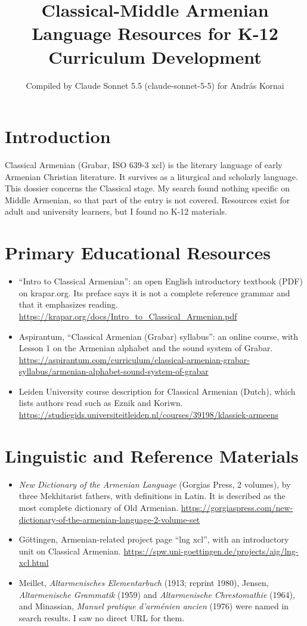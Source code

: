 \documentclass[12pt]{article}
\title{Classical-Middle Armenian Language Resources for K-12 Curriculum Development}
\author{Compiled by Claude Sonnet 5.5 (claude-sonnet-5-5) for Andr\'as Kornai}
\date{}
\begin{document}
\maketitle

\section{Introduction}
Classical Armenian (Grabar, ISO 639-3 xcl) is the literary language of early Armenian Christian literature. It survives as a liturgical and scholarly language. This dossier concerns the Classical stage. My search found nothing specific on Middle Armenian, so that part of the entry is not covered. Resources exist for adult and university learners, but I found no K-12 materials.

\section{Primary Educational Resources}
\begin{itemize}
\item ``Intro to Classical Armenian'': an open English introductory textbook (PDF) on krapar.org. Its preface says it is not a complete reference grammar and that it emphasizes reading. \url{https://krapar.org/docs/Intro_to_Classical_Armenian.pdf}
\item Aspirantum, ``Classical Armenian (Grabar) syllabus'': an online course, with Lesson 1 on the Armenian alphabet and the sound system of Grabar. \url{https://aspirantum.com/curriculum/classical-armenian-grabar-syllabus/armenian-alphabet-sound-system-of-grabar}
\item Leiden University course description for Classical Armenian (Dutch), which lists authors read such as Eznik and Koriwn. \url{https://studiegids.universiteitleiden.nl/courses/39198/klassiek-armeens}
\end{itemize}

\section{Linguistic and Reference Materials}
\begin{itemize}
\item \emph{New Dictionary of the Armenian Language} (Gorgias Press, 2 volumes), by three Mekhitarist fathers, with definitions in Latin. It is described as the most complete dictionary of Old Armenian. \url{https://gorgiaspress.com/new-dictionary-of-the-armenian-language-2-volume-set}
\item G\"ottingen, Armenian-related project page ``lng xcl'', with an introductory unit on Classical Armenian. \url{https://spw.uni-goettingen.de/projects/aig/lng-xcl.html}
\item Meillet, \emph{Altarmenisches Elementarbuch} (1913; reprint 1980), Jensen, \emph{Altarmenische Grammatik} (1959) and \emph{Altarmenische Chrestomathie} (1964), and Minassian, \emph{Manuel pratique d'arm\'enien ancien} (1976) were named in search results. I saw no direct URL for them.
\end{itemize}
\end{document}
